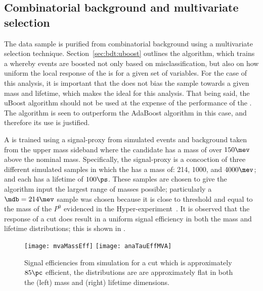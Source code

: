 \subsection{Combinatorial background and multivariate selection}
The data sample is purified from combinatorial background using a multivariate selection technique.
Section~\ref{sec:bdt:uboost} outlines the \uBDT algorithm, which trains a \BDT whereby events are
boosted not only based on misclassification, but also on how uniform the local response of the \BDT
is for a given set of variables.
For the case of this analysis, it is important that the \BDT does not bias the sample towards a
given mass and
lifetime, which makes the \uBDT ideal for this analysis.
That being said, the uBoost algorithm should not be used at the expense of the performance of the
\BDT.
The \uBDT algorithm is seen to outperform the AdaBoost algorithm in this case,
and therefore its use is justified.

A \uBDT is trained using a signal-proxy from simulated events and background taken from the upper
\Bd mass sideband where the \Bd candidate has a mass of over $150\mev$ above the nominal \Bd mass.
Specifically, the signal-proxy is a concoction of three different simulated samples in which the
\db has a mass of: 214, 1000, and $4000\mev$; and each has a lifetime of $100\ps$.
These samples are chosen to give the \uBDT algorithm input the largest range of masses possible;
particularly a $\mdb=214\mev$ sample was chosen because it is close to threshold and equal to the
mass of the $P^0$ evidenced in the Hyper-\CP experiment~\cite{Park:2005eka}.
It is observed that the response of a \uBDT cut does result in a uniform signal efficiency in both
the mass and lifetime distributions; this is shown in .

\begin{figure}
  \begin{center}
    \texttt{[image: mvaMassEff]}
    \texttt{[image: anaTauEffMVA]}
    \caption[Signal efficiency of a uBDT cut as a function of mass and lifetime]
    {
      Signal efficiencies from simulation for a \uBDT cut which is approximately $85\pc$ efficient,
      the distributions are are approximately flat in both the (left) mass and (right) lifetime
      dimensions.
    }
    \label{fig:db:bdtflat}
  \end{center}
\end{figure}

